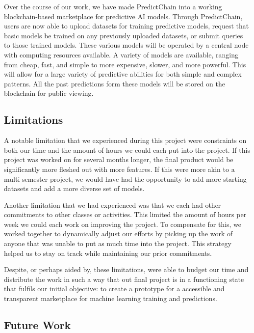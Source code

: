 \documentclass{ledger}
\begin{document}
Over the course of our work, we have made PredictChain into a working blockchain-based marketplace for predictive AI models.
Through PredictChain, users are now able to upload datasets for training predictive models, request that basic models
be trained on any previously uploaded datasets, or submit queries to those trained models.
These various models will be operated by a central node with computing resources available. A variety of
models are available, ranging from cheap, fast, and simple to more expensive, slower, and more powerful.
This will allow for a large variety of predictive abilities for both simple and complex patterns.  All the past predictions
form these models will be stored on the blockchain for public viewing.

\subsection{Limitations}

A notable limitation that we experienced during this project were constraints on both our time and the amount of
hours we could each put into the project.  If this project was worked on for several months longer, the final product
would be significantly more fleshed out with more features.  If this were more akin to a multi-semester project,
we would have had the opportunity to add more starting datasets and add a more diverse set of models.

Another limitation that we had experienced was that we each had other commitments to other classes or activities.
This limited the amount of hours per week we could each work on improving the project.  To compensate for this, we
worked together to dynamically adjust our efforts by picking up the work of anyone that was unable to put as much
time into the project. This strategy helped us to stay on track while maintaining our prior commitments.

Despite, or perhaps aided by, these limitations, were able to budget our time and distribute the work in such a way
that out final project is in a functioning state that fulfils our initial objective: to create a prototype for a
accessible and transparent marketplace for machine learning training and predictions.

\subsection{Future Work}
\end{document}

